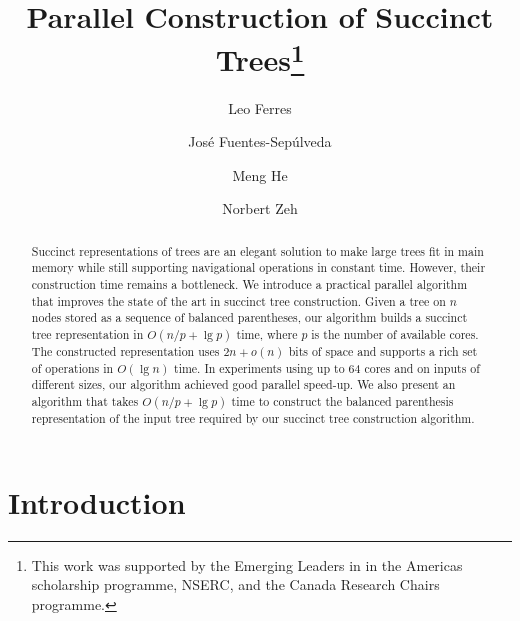 \documentclass[runningheads]{llncs}
\begin{document}
\title{Parallel Construction of Succinct Trees\thanks{This work was
    supported by the Emerging Leaders in in the Americas scholarship
    programme, NSERC, and the Canada Research Chairs programme.}}

\author{Leo Ferres
  \and
  Jos\'e Fuentes-Sep\'ulveda
  \and
  Meng He
  \and
  Norbert Zeh}




\maketitle

\begin{abstract}
  Succinct representations of trees are an elegant solution to
  make large trees fit in main memory while still supporting
  navigational operations in constant time.  However, their construction
  time remains a bottleneck.  We
  introduce a practical parallel algorithm that improves the state of
  the art in succinct tree construction.  Given a tree on $n$ nodes
  stored as a sequence of balanced parentheses, our algorithm
  builds a succinct tree representation in $O(n/p+\lg p)$ time,
  where $p$ is the number of available cores.  The constructed
  representation uses $2n + o(n)$ bits of space and supports a rich
  set of operations in $O(\lg n)$ time.  In experiments using up to
  64 cores and on inputs of different sizes, our algorithm
  achieved good parallel speed-up.
  We also present an
  algorithm that takes $O(n/p + \lg p)$ time to construct the
  balanced parenthesis representation of the input tree required by
  our succinct tree construction algorithm.
\end{abstract}
%


\section{Introduction}
\label{sec:introduction}

\end{document}

